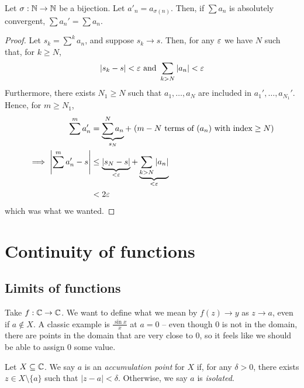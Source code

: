 \documentclass{../../template/note}
\begin{document}
    \begin{proposition}
        Let \(\sigma: \mathbb N \to \mathbb N\) be a bijection. Let \(a'_n = a_{\sigma(n)}\). Then, if \(\sum a_n\) is absolutely convergent, \(\sum a_n' = \sum a_n\).        
    \end{proposition}
    
    \begin{proof}
        Let \(s_k = \sum^k a_n\), and suppose \(s_k \to s\). Then, for any \(\varepsilon\) we have \(N\) such that, for \(k \geq N\),
        \begin{align*}
            |s_k - s| < \varepsilon \text{ and } \sum_{k > N} |a_n| < \varepsilon
        \end{align*}
        Furthermore, there exists \(N_1 \geq N\) such that \(a_1, \dots, a_N\) are included in \(a_1', \dots, a_{N_1}'\). Hence, for \(m \geq N_1\), 
        \begin{align*}
            \sum^m a_n' &= \underbrace{\sum^N a_n}_{s_N} + \;(m-N\text{ terms of }(a_n)\text{ with index}\geq N) \\
            \implies \left|\sum^m a_n'-s\right| &\leq \underbrace{|s_N - s|}_{<\varepsilon} + \underbrace{\sum_{k > N}|a_n|}_{<\varepsilon} \\
            &< 2\varepsilon
        \end{align*}
        which was what we wanted.
    \end{proof}
    
    \section{Continuity of functions}

    \subsection{Limits of functions}

    Take \(f: \mathbb C \to \mathbb C\). We want to define what we mean by \(f(z) \to y\) as \(z \to a\), even if \(a \notin X\). A classic example is \(\frac{\sin x}{x}\) at \(a=0\) -- even though 0 is not in the domain, there are points in the domain that are very close to 0, so it feels like we should be able to assign 0 some value.

    \begin{definition}
        Let \(X \subseteq \mathbb C\). We say \(a\) is an \emph{accumulation point} for \(X\) if, for any \(\delta > 0\), there exists \(z \in X \setminus \{a\}\) such that \(|z-a| < \delta\). Otherwise, we say \(a\) is \emph{isolated}.
    \end{definition}
    
\end{document}
